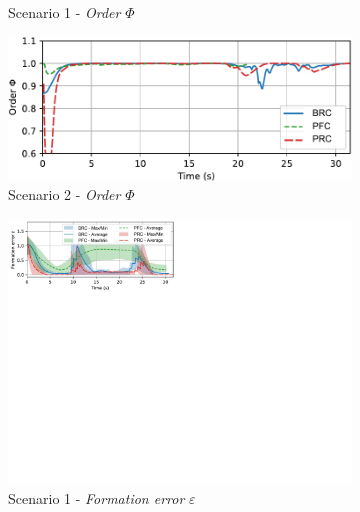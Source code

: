\begin{figure}
\begin{subfigure}[b]{0.495\textwidth}
    \caption{Scenario 1 - \textit{Order} $\Phi$}
    \label{fig:order1}
    \end{subfigure}
    \begin{subfigure}[b]{0.495\textwidth}
    \includegraphics[width=\textwidth]{paper3/images/order_scen2.pdf}
    \caption{Scenario 2 - \textit{Order} $\Phi$}
    \label{fig:order2}
    \end{subfigure}
    \begin{subfigure}[b]{0.495\textwidth}
    \includegraphics[width=\textwidth]{paper3/images/error_scen1.pdf}
    \caption{Scenario 1 - \textit{Formation error} $\varepsilon$}
    \label{fig:error1}
    \end{subfigure}
    \begin{subfigure}[b]{0.495\textwidth}

\end{subfigure}
\end{figure}
